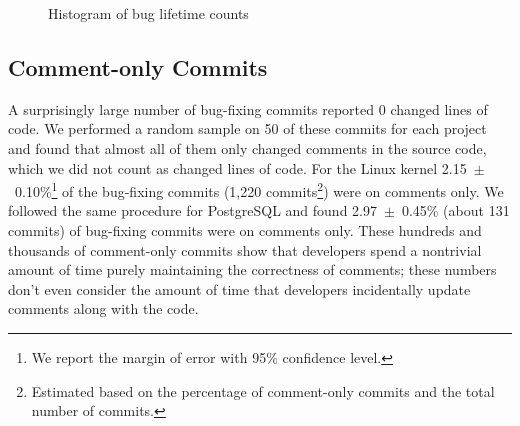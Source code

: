 \begin{figure}[tbh]
\centering
{}
\caption{\label{fig-bug-lifetime}Histogram of bug lifetime counts}
\end{figure}

\subsection{Comment-only Commits}
\label{sec-comment-only}

A surprisingly large number of bug-fixing commits reported 0
changed lines of code. We performed a random sample on 50 of these commits for
each project and found that almost all of them only changed comments in the
source code, which we did not count as changed lines of code. For the Linux
kernel 2.15~$\pm$~0.10\%\footnote{We report the margin of error with 95\%
 confidence level.} of the bug-fixing commits (1,220
commits\footnote{Estimated based on the percentage of comment-only commits and
 the total number of commits.}) were on comments only. We followed the same
procedure for PostgreSQL and found 2.97~$\pm$~0.45\% (about 131 commits) of
bug-fixing commits were on comments only. These hundreds and thousands of
comment-only commits show that developers spend a nontrivial amount of time
purely maintaining the correctness of comments; these numbers don't even
consider the amount of time that developers incidentally update comments along
with the code.

